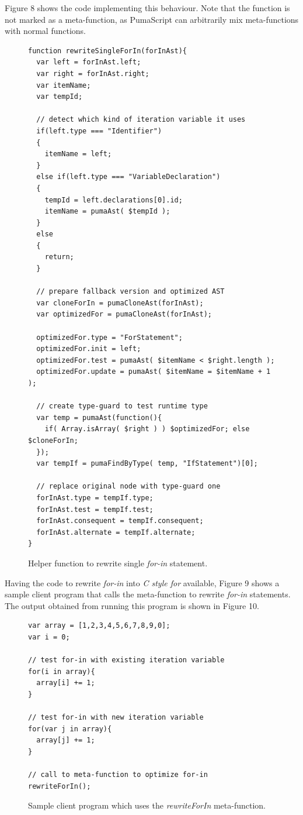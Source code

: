 \documentclass[preprint,10pt]{sigplanconf}
\begin{document}
Figure 8 shows the code implementing this behaviour. Note that the function is not marked as a meta-function, as PumaScript can arbitrarily mix meta-functions with normal functions.

\begin{figure}
\begin{lstlisting}
function rewriteSingleForIn(forInAst){
  var left = forInAst.left;
  var right = forInAst.right;
  var itemName;
  var tempId;
  
  // detect which kind of iteration variable it uses
  if(left.type === "Identifier")
  {
    itemName = left;
  }
  else if(left.type === "VariableDeclaration")
  {
    tempId = left.declarations[0].id;
    itemName = pumaAst( $tempId );
  }
  else
  {
    return;
  }

  // prepare fallback version and optimized AST
  var cloneForIn = pumaCloneAst(forInAst);
  var optimizedFor = pumaCloneAst(forInAst);

  optimizedFor.type = "ForStatement";
  optimizedFor.init = left;
  optimizedFor.test = pumaAst( $itemName < $right.length );
  optimizedFor.update = pumaAst( $itemName = $itemName + 1 );
  
  // create type-guard to test runtime type
  var temp = pumaAst(function(){
    if( Array.isArray( $right ) ) $optimizedFor; else $cloneForIn;
  });
  var tempIf = pumaFindByType( temp, "IfStatement")[0];

  // replace original node with type-guard one
  forInAst.type = tempIf.type;
  forInAst.test = tempIf.test;
  forInAst.consequent = tempIf.consequent;
  forInAst.alternate = tempIf.alternate;
}
\end{lstlisting}
\caption{Helper function to rewrite single \emph{for-in} statement.}
\label{fig:8}
\end{figure}

Having the code to rewrite \emph{for-in} into \emph{C style for} available, Figure 9 shows a sample client program that calls the meta-function to rewrite \emph{for-in} statements. The output obtained from running this program is shown in Figure 10.

\begin{figure}
\begin{lstlisting}
var array = [1,2,3,4,5,6,7,8,9,0];
var i = 0;

// test for-in with existing iteration variable
for(i in array){
  array[i] += 1;
}

// test for-in with new iteration variable
for(var j in array){
  array[j] += 1;
}

// call to meta-function to optimize for-in
rewriteForIn();
\end{lstlisting}
\caption{Sample client program which uses the \emph{rewriteForIn} meta-function.}
\label{fig:9}
\end{figure}
\end{document}
